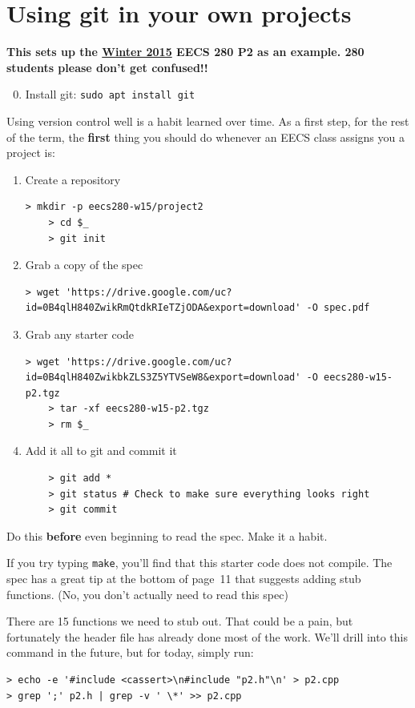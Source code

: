 \documentclass{article}
\begin{document}
\newpage
\section{Using git in your own projects}
\textbf{\color{red} This sets up the \ul{Winter 2015} EECS 280 P2 as
an example. 280 students please don't get confused!!}
\begin{enumerate}
    \setcounter{enumi}{-1}
  \item Install git: \texttt{sudo apt install git}
\end{enumerate}
\noindent
Using version control well is a habit learned over time. As a first step, for
the rest of the term, the \textbf{first} thing you should do whenever an EECS
class assigns you a project is:
\begin{enumerate}
  \item Create a repository
    \begin{Verbatim}[fontsize=\footnotesize]
    > mkdir -p eecs280-w15/project2
    > cd $_
    > git init
    \end{Verbatim}
  \item Grab a copy of the spec
    \begin{Verbatim}[fontsize=\footnotesize]
    > wget 'https://drive.google.com/uc?id=0B4qlH840ZwikRmQtdkRIeTZjODA&export=download' -O spec.pdf
    \end{Verbatim}
  \item Grab any starter code
    \begin{Verbatim}[fontsize=\footnotesize]
    > wget 'https://drive.google.com/uc?id=0B4qlH840ZwikbkZLS3Z5YTVSeW8&export=download' -O eecs280-w15-p2.tgz
    > tar -xf eecs280-w15-p2.tgz
    > rm $_
    \end{Verbatim}
  \item Add it all to git and commit it
    \begin{lstlisting}
    > git add *
    > git status # Check to make sure everything looks right
    > git commit
    \end{lstlisting}
\end{enumerate}
Do this \textbf{before} even beginning to read the spec. Make it a habit.

\medskip
\noindent
If you try typing \texttt{make}, you'll find that this starter code does not
compile. The spec has a great tip at the bottom of page~11 that suggests
adding stub functions. {\small (No, you don't actually need to read this spec)}

\medskip
\noindent
There are 15 functions we need to stub out. That could be a pain, but
fortunately the header file has already done most of the work. We'll drill
into this command in the future, but for today, simply run:
\begin{lstlisting}
> echo -e '#include <cassert>\n#include "p2.h"\n' > p2.cpp
> grep ';' p2.h | grep -v ' \*' >> p2.cpp
\end{lstlisting}
\end{document}
